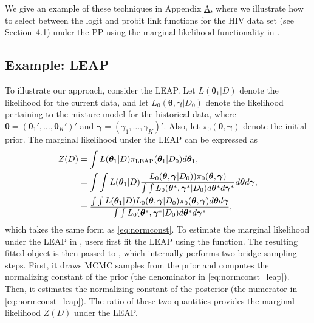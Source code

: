 We give an example of these techniques in Appendix \hyperref[sec:app_link_selection]{A}, where we illustrate how to select between the logit and probit link functions for the HIV data set (see Section~\hyperref[sec:dataanalysis_logistic]{4.1}) under the PP using the marginal likelihood functionality in . 

\subsection{Example: LEAP}
To illustrate our approach, consider the LEAP. Let $L(\bm{\theta}_1 | D)$ denote the likelihood for the current data, and let $L_0(\bm{\theta}, \bm{\gamma} | D_0)$ denote the likelihood pertaining to the mixture model for the historical data, where $\bm{\theta} = (\bm{\theta}_1', \ldots, \bm{\theta}_K')'$ and $\bm{\gamma} = (\gamma_1, \ldots, \gamma_K)'$. Also, let $\pi_0(\bm{\theta}, \bm{\gamma})$ denote the initial prior. The marginal likelihood under the LEAP can be expressed as
\begin{align}
    Z(D) &= \int L(\bm{\theta}_1 | D) \pi_\text{LEAP}(\bm{\theta}_1 | D_0) d\bm{\theta}_1, \notag \\
    &= \int \int L(\bm{\theta}_1 | D) \frac{ L_0(\bm{\theta}, \bm{\gamma} | D_0)) \pi_0(\bm{\theta}, \bm{\gamma})  }{ \int \int L_0(\bm{\theta}^*, \bm{\gamma}^* | D_0) d\bm{\theta}^* d\bm{\gamma}^* } d\bm{\theta} d\bm{\gamma}
    ,\notag \\ 
    &= \frac{ \int \int L(\bm{\theta}_1 | D) L_0(\bm{\theta}, \bm{\gamma} | D_0) \pi_0(\bm{\theta}, \bm{\gamma}) d\bm{\theta} d\bm{\gamma} }
    {\int \int L_0(\bm{\theta}^*, \bm{\gamma}^* | D_0) d\bm{\theta}^* d\bm{\gamma}^*},
    \label{eq:normconst_leap}
\end{align}
which takes the same form as \eqref{eq:normconst}. To estimate the marginal likelihood under the LEAP in , users first fit the LEAP using the  function. The resulting fitted object is then passed to , which internally performs two bridge-sampling steps. First, it draws MCMC samples from the prior and computes the normalizing constant of the prior (the denominator in \eqref{eq:normconst_leap}). Then, it estimates the normalizing constant of the posterior (the numerator in \eqref{eq:normconst_leap}). The ratio of these two quantities provides the marginal likelihood $Z(D)$ under the LEAP.

